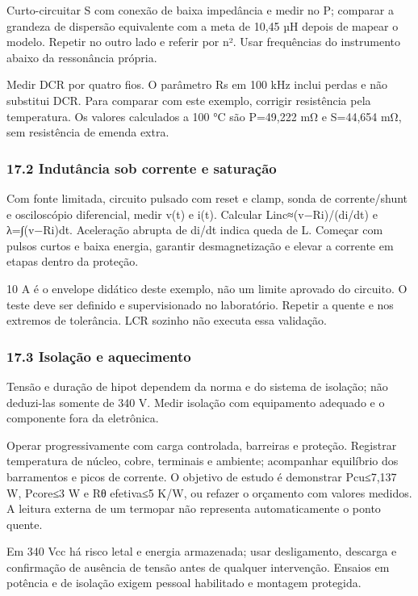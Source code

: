 \documentclass[
]{article}
\begin{document}
Curto-circuitar S com conexão de baixa impedância e medir no P; comparar
a grandeza de dispersão equivalente com a meta de 10,45 µH depois de
mapear o modelo. Repetir no outro lado e referir por n². Usar
frequências do instrumento abaixo da ressonância própria.

Medir DCR por quatro fios. O parâmetro Rs em 100 kHz inclui perdas e não
substitui DCR. Para comparar com este exemplo, corrigir resistência pela
temperatura. Os valores calculados a 100 °C são P=49,222 mΩ e S=44,654
mΩ, sem resistência de emenda extra.

\subsubsection{17.2 Indutância sob corrente e
saturação}\label{indutuxe2ncia-sob-corrente-e-saturauxe7uxe3o}

Com fonte limitada, circuito pulsado com reset e clamp, sonda de
corrente/shunt e osciloscópio diferencial, medir v(t) e i(t). Calcular
Linc≈(v−Ri)/(di/dt) e λ=∫(v−Ri)dt. Aceleração abrupta de di/dt indica
queda de L. Começar com pulsos curtos e baixa energia, garantir
desmagnetização e elevar a corrente em etapas dentro da proteção.

10 A é o envelope didático deste exemplo, não um limite aprovado do
circuito. O teste deve ser definido e supervisionado no laboratório.
Repetir a quente e nos extremos de tolerância. LCR sozinho não executa
essa validação.

\subsubsection{17.3 Isolação e
aquecimento}\label{isolauxe7uxe3o-e-aquecimento}

Tensão e duração de hipot dependem da norma e do sistema de isolação;
não deduzi-las somente de 340 V. Medir isolação com equipamento adequado
e o componente fora da eletrônica.

Operar progressivamente com carga controlada, barreiras e proteção.
Registrar temperatura de núcleo, cobre, terminais e ambiente; acompanhar
equilíbrio dos barramentos e picos de corrente. O objetivo de estudo é
demonstrar Pcu≤7,137 W, Pcore≤3 W e Rθ efetiva≤5 K/W, ou refazer o
orçamento com valores medidos. A leitura externa de um termopar não
representa automaticamente o ponto quente.

Em 340 Vcc há risco letal e energia armazenada; usar desligamento,
descarga e confirmação de ausência de tensão antes de qualquer
intervenção. Ensaios em potência e de isolação exigem pessoal habilitado
e montagem protegida.
\end{document}
